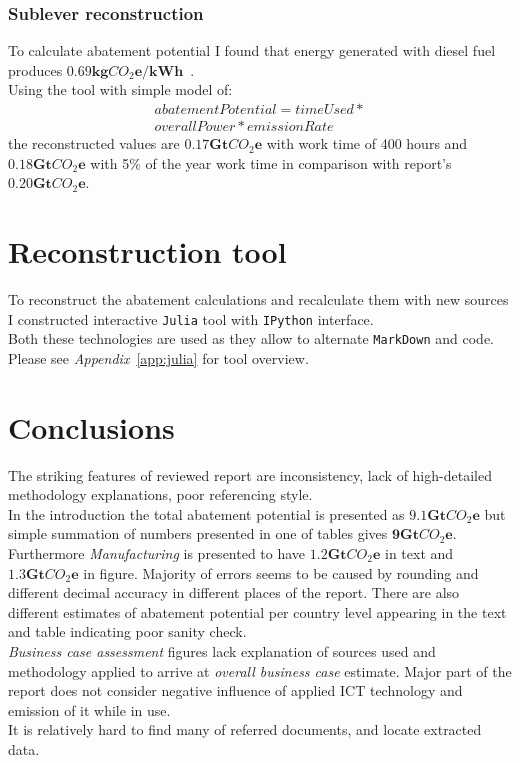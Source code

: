\documentclass[11pt, twocolumn]{article}
\begin{document}
\subsubsection{Sublever reconstruction\label{sec:off-grid:reconstruction}}
To calculate abatement potential I found that energy generated with diesel fuel produces $\mathbf{0.69kg}CO_2\mathbf{e}/\mathbf{kWh}$~\citep{iea2012co2}.\\
Using the tool with simple model of:\\
\begin{gather*}
  abatementPotential = timeUsed *\\
  overallPower * emissionRate
\end{gather*}
the reconstructed values are $\mathbf{0.17} \mathbf{Gt}CO_2\mathbf{e}$ with work time of 400 hours and $\mathbf{0.18} \mathbf{Gt}CO_2\mathbf{e}$ with 5\% of the year work time in comparison with report's $\mathbf{0.20} \mathbf{Gt}CO_2\mathbf{e}$.




\section{Reconstruction tool}
To reconstruct the abatement calculations and recalculate them with new sources I constructed interactive \texttt{Julia} tool with \texttt{IPython} interface.\\
Both these technologies are used as they allow to alternate \texttt{MarkDown} and code. Please see \emph{Appendix}~\ref{app:julia} for tool overview.

\section{Conclusions}
The striking features of reviewed report are inconsistency, lack of high-detailed methodology explanations, poor referencing style.\\
In the introduction the total abatement potential is presented as $\mathbf{9.1} \mathbf{Gt}CO_2\mathbf{e}$ but simple summation of numbers presented in one of tables gives $\mathbf{9} \mathbf{Gt}CO_2\mathbf{e}$. Furthermore \emph{Manufacturing} is presented to have $\mathbf{1.2} \mathbf{Gt}CO_2\mathbf{e}$ in text and $\mathbf{1.3} \mathbf{Gt}CO_2\mathbf{e}$ in figure. Majority of errors seems to be caused by rounding and different decimal accuracy in different places of the report. There are also different estimates of abatement potential per country level appearing in the text and table indicating poor sanity check.\\
\emph{Business case assessment} figures lack explanation of sources used and methodology applied to arrive at \emph{overall business case} estimate. Major part of the report does not consider negative influence of applied ICT technology and emission of it while in use.\\
It is relatively hard to find many of referred documents, and locate extracted data.\\
\end{document}
